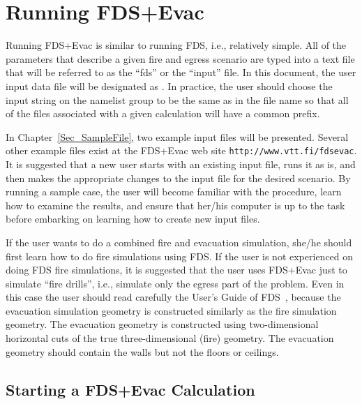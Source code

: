 \documentclass[12pt,a4paper,final,twoside]{stylevk}
\begin{document}
\begin{enumerate}

%
\end{enumerate}
%

\clearpage

\newpage


\chapter{Running FDS+Evac}\label{Sec_Running}

\noindent Running FDS+Evac is similar to running FDS, i.e.,
relatively simple.  All of the parameters that describe a given fire
and egress scenario are typed into a text file that will be referred
to as the ``fds'' or the ``input'' file.  In this document, the user
input data file will be designated as .  In practice,
the user should choose the input string  on the
 namelist group to be the same as in the file name so that
all of the files associated with a given calculation will have a
common prefix.


In Chapter~\ref{Sec_SampleFile}, two example input files will be
presented.  Several other example files exist at the FDS+Evac web site
\verb+http://www.vtt.fi/fdsevac+.  It is suggested that a new user
starts with an existing input file, runs it as is, and then makes the
appropriate changes to the input file for the desired scenario.  By
running a sample case, the user will become familiar with the
procedure, learn how to examine the results, and ensure that her/his
computer is up to the task before embarking on learning how to create
new input files.


If the user wants to do a combined fire and evacuation simulation,
she/he should first learn how to do fire simulations using FDS.  If
the user is not experienced on doing FDS fire simulations, it is
suggested that the user uses FDS+Evac just to simulate ``fire
drills'', i.e., simulate only the egress part of the problem.
Even in this case the user should read carefully the User's Guide of
FDS~\cite{FDS_UserGuide}, because the evacuation simulation geometry is
constructed similarly as the fire simulation geometry.  The evacuation
geometry is constructed using two-dimensional horizontal cuts of the
true three-dimensional (fire) geometry.  The evacuation geometry
should contain the walls but not the floors or ceilings.


\section{Starting a FDS+Evac Calculation} 
\end{document}
